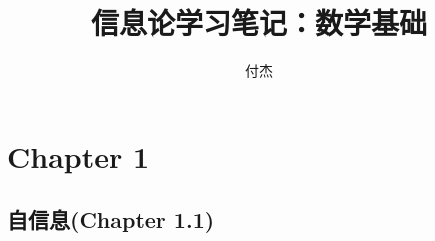 \documentclass{article}
\title{信息论学习笔记：数学基础}
\author{付杰}
\begin{document}
\maketitle
\section{Chapter 1}
\subsection{自信息(Chapter 1.1)}

\end{document}
